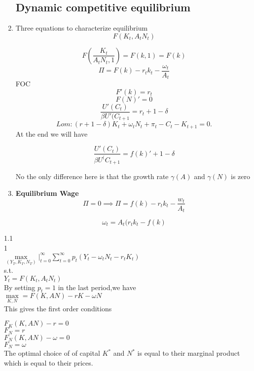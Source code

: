 \documentclass[12pt]{article}
\numberwithin{equation}{subsection} %
\begin{document}
\begin{enumerate}
\subsection{Dynamic competitive equilibrium}
\item {Three equations to characterize equilibrium}\\

$$
  F( K_{t}, A_{t} N_{t})
$$

$$
F \left( \frac{ K_{t}}{A_{t} N_{t}, 1} \right)= F(k,1)= F(k)
$$
$$
\Pi= F(k)- r_t k_t - \frac{\omega_{t}}{A_{t}}
$$
FOC
$$
F\prime(k)= r_{t}
$$
$$
F(N)\prime=0
$$
$$
 \frac{U\prime( C_{t})}{\beta U\prime( C_{t+1} }= r_{t} +1-\delta
$$
$$
Lom:  ( r+1-\delta) K_{t }+ \omega_{t }N_{t }+\pi_{t }- C_{t }-K_{t+1} =0.
$$
At the end we will have

$$
 \frac{U\prime( C_t)}{\beta U^( C_{t+1} }= f(k)\prime +1-\delta
$$

No the only difference here is that the growth rate $\gamma(A)$ and $\gamma(N)$ is zero 

\item  \textbf{Equilibrium Wage} 
$$
\Pi =0  \implies \Pi= f(k)- r_{t} k_{t}- \frac{w_{t}}{A_{t}}
$$

$$
\omega_{t}=A_{t}( r_{t} k_{t}-f(k)
$$
\end{enumerate}
1.1\\
1\\
$\underset{(Y_{T},K_{T},N_{T})}{\max} |^{\infty}_{t=0} \sum_{t=0}^{\infty} p_{t}(Y_{t}-\omega_{t}N_{t}-r_{t}K_{t})$\\

s.t.\\

$Y_{t}=F(K_{t},A_{t}N_{t})$\\

By setting $p_{t}=1$ in the last period,we have\\

$\underset{K,N}{\max}=F(K,AN)-rK-\omega N$\\

This gives the first order conditions

$F_{K}(K,AN)-r=0$\\
$F_{N}=r$\\
$F_{N}(K,AN)-\omega=0$\\
$F_{N}=\omega$\\
The optimal choice of of capital  $K^{*}$  and $N^{*}$ is equal to  their  marginal product  which is equal to their prices.\
\end{document}
